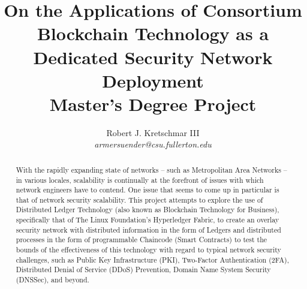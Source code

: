 \documentclass[12pt]{article}
\title{\bf{On the Applications of Consortium Blockchain Technology as a Dedicated Security Network Deployment\\
	\Large{Master's Degree Project}
	}}
\author{Robert J. Kretschmar III\\
	\textit{armersuender@csu.fullerton.edu}
	}
\affil{California State University, Fullerton}
\date{}
\begin{document}
	\maketitle
	\begin{abstract}
		With the rapidly expanding state of networks -- such as Metropolitan Area Networks -- in various locales, scalability is continually at the forefront of issues with which network engineers have to contend. One issue that seems to come up in particular is that of network security scalability. This project attempts to explore the use of Distributed Ledger Technology (also known as Blockchain Technology for Business), specifically that of The Linux Foundation's Hyperledger Fabric, to create an overlay security network with distributed information in the form of Ledgers and distributed processes in the form of programmable Chaincode (Smart Contracts) to test the bounds of the effectiveness of this technology with regard to typical network security challenges, such as Public Key Infrastructure (PKI), Two-Factor Authentication (2FA), Distributed Denial of Service (DDoS) Prevention, Domain Name System Security (DNSSec), and beyond.
	\end{abstract}
	\newpage
	\tableofcontents
	
	
	
	
	
	
	
	
	
	
	
	
	
\end{document}
